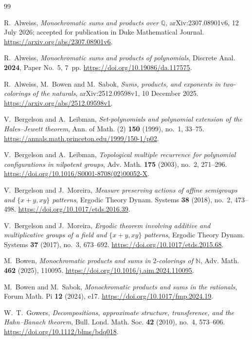 \begin{thebibliography}{99}

R.~Alweiss,
\emph{Monochromatic sums and products over $\mathbb{Q}$},
arXiv:2307.08901v6, 12 July 2026; accepted for publication in Duke Mathematical Journal.
\url{https://arxiv.org/abs/2307.08901v6}.

R.~Alweiss,
\emph{Monochromatic sums and products of polynomials},
Discrete Anal. \textbf{2024}, Paper No.~5, 7~pp.
\url{https://doi.org/10.19086/da.117575}.

R.~Alweiss, M.~Bowen and M.~Sabok,
\emph{Sums, products, and exponents in two-colorings of the naturals},
arXiv:2512.09598v1, 10 December 2025.
\url{https://arxiv.org/abs/2512.09598v1}.

V.~Bergelson and A.~Leibman,
\emph{Set-polynomials and polynomial extension of the Hales--Jewett theorem},
Ann. of Math. (2) \textbf{150} (1999), no.~1, 33--75.
\url{https://annals.math.princeton.edu/1999/150-1/p02}.

V.~Bergelson and A.~Leibman,
\emph{Topological multiple recurrence for polynomial configurations in nilpotent groups},
Adv. Math. \textbf{175} (2003), no.~2, 271--296.
\url{https://doi.org/10.1016/S0001-8708(02)00052-X}.

V.~Bergelson and J.~Moreira,
\emph{Measure preserving actions of affine semigroups and
$\{x+y,xy\}$ patterns},
Ergodic Theory Dynam. Systems \textbf{38} (2018), no.~2, 473--498.
\url{https://doi.org/10.1017/etds.2016.39}.

V.~Bergelson and J.~Moreira,
\emph{Ergodic theorem involving additive and multiplicative groups of a
field and $\{x+y,xy\}$ patterns},
Ergodic Theory Dynam. Systems \textbf{37} (2017), no.~3, 673--692.
\url{https://doi.org/10.1017/etds.2015.68}.

M.~Bowen,
\emph{Monochromatic products and sums in $2$-colorings of $\mathbb{N}$},
Adv. Math. \textbf{462} (2025), 110095.
\url{https://doi.org/10.1016/j.aim.2024.110095}.

M.~Bowen and M.~Sabok,
\emph{Monochromatic products and sums in the rationals},
Forum Math. Pi \textbf{12} (2024), e17.
\url{https://doi.org/10.1017/fmp.2024.19}.

W.~T.~Gowers,
\emph{Decompositions, approximate structure, transference, and the Hahn--Banach theorem},
Bull. Lond. Math. Soc. \textbf{42} (2010), no.~4, 573--606.
\url{https://doi.org/10.1112/blms/bdq018}.


\end{thebibliography}
